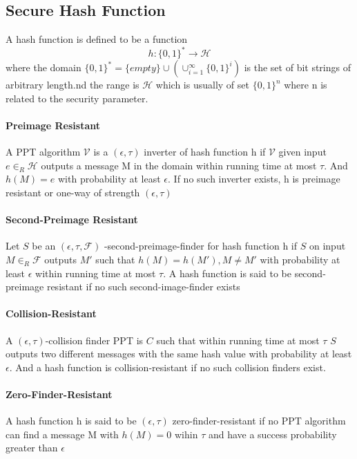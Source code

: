 \documentclass[12]{article}
\begin{document}
\subsection{Secure Hash Function}
A hash function is defined to be a function
\begin{equation*}
h:\{0,1\}^* \to \mathcal{H}
\end{equation*}
where the domain $\{0,1\}^* = \{empty\} \cup (\cup_{i=1}^{\infty}\{0,1\}^i)$ is the set of bit strings of arbitrary length.nd the range is $\mathcal{H}$ which is usually of set $\{0,1\}^n$ where n is related to the security parameter.
\paragraph{Preimage Resistant}
A PPT algorithm $\mathcal{V}$ is a $(\epsilon, \tau)$ inverter of hash function h if $\mathcal{V}$ given input $e \in_R \mathcal{H}$ outputs a message M
in the domain within running time at most $\tau$.
And $h(M)=e$ with probability at least $\epsilon$.
If no such inverter exists, h is preimage resistant or one-way of strength $(\epsilon, \tau)$\\
\paragraph{Second-Preimage Resistant}
Let $S$ be an $(\epsilon, \tau, \mathscr{F})$
-second-preimage-finder for hash function h if $S$ on
input $M\in_R\mathscr{F}$ outputs
$M\prime$ such that $h(M)=h(M\prime), M\neq M\prime$ with probability at least $\epsilon$ within running time at most $\tau$.
A hash function is said to be second-preimage resistant if no such second-image-finder exists\\
\paragraph{Collision-Resistant}
A $(\epsilon, \tau)$-collision finder PPT is $C$ such that within running time at most $\tau$ $S$ outputs two different messages with the same hash value with probability at least $\epsilon$. And a hash function is collision-resistant if no such collision finders exist.
\paragraph{Zero-Finder-Resistant}
A hash function h is said to be $(\epsilon, \tau)$ zero-finder-resistant if no PPT algorithm can find a message M with $h(M)=0$ wihin
$\tau$ and have a success probability greater than $\epsilon$
\end{document}
